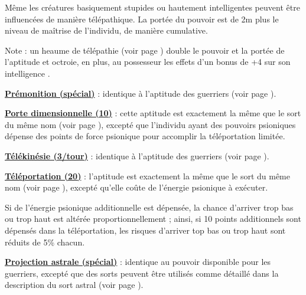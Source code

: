 \bigskip

Même les créatures basiquement stupides ou hautement intelligentes peuvent être influencées de manière télépathique. La portée du pouvoir est de 2m plus le niveau de maîtrise de l'individu, de manière cumulative.

Note : un heaume de télépathie (voir page \pageref{objet-heaume-telepathie}) double le pouvoir et la portée de l'aptitude et octroie, en plus, au possesseur les effets d'un bonus de +4 sur son intelligence .

\bigskip

\textbf{\uline{Prémonition (spécial)}} : identique à l'aptitude des guerriers (voir page \pageref{guerrier-premonition}).

\bigskip

\label{magicien-porte-dimensionnelle}\textbf{\uline{Porte dimensionnelle (10)}} : cette aptitude est exactement la même que le sort du même nom (voir page \pageref{sort-porte-dimensionnelle}), excepté que l'individu ayant des pouvoirs psioniques dépense des points de force psionique pour accomplir la téléportation limitée.

\bigskip

\textbf{\uline{Télékinésie (3/tour)}} : identique à l'aptitude des guerriers (voir page \pageref{guerrier-telekinesie}).

\bigskip

\label{magicien-teleportation}\textbf{\uline{Téléportation (20)}} : l'aptitude est exactement la même que le sort du même nom (voir page \pageref{sort-teleporter}), excepté qu'elle coûte de l'énergie psionique à exécuter.

\bigskip

Si de l'énergie psionique additionnelle est dépensée, la chance d'arriver trop bas ou trop haut est altérée proportionnellement ; ainsi, si 10 points additionnels sont dépensés dans la téléportation, les risques d'arriver top bas ou trop haut sont réduits de 5\% chacun.

\bigskip

\label{magicien-projection-astrale}\textbf{\uline{Projection astrale (spécial)}} : identique au pouvoir disponible pour les guerriers, excepté que des sorts peuvent être utilisés comme détaillé dans la description du sort astral (voir page \pageref{sort-astral}).

